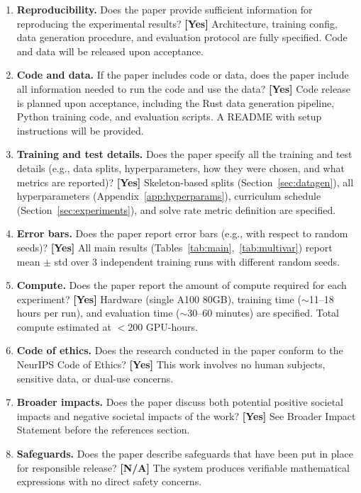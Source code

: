 \documentclass{article}
\begin{document}
\begin{enumerate}
\item \textbf{Reproducibility.}
Does the paper provide sufficient information for reproducing the experimental results?
\textbf{[Yes]} Architecture, training config, data generation procedure, and evaluation protocol are fully specified. Code and data will be released upon acceptance.

\item \textbf{Code and data.}
If the paper includes code or data, does the paper include all information needed to run the code and use the data?
\textbf{[Yes]} Code release is planned upon acceptance, including the Rust data generation pipeline, Python training code, and evaluation scripts. A README with setup instructions will be provided.

\item \textbf{Training and test details.}
Does the paper specify all the training and test details (e.g., data splits, hyperparameters, how they were chosen, and what metrics are reported)?
\textbf{[Yes]} Skeleton-based splits (Section~\ref{sec:datagen}), all hyperparameters (Appendix~\ref{app:hyperparams}), curriculum schedule (Section~\ref{sec:experiments}), and solve rate metric definition are specified.

\item \textbf{Error bars.}
Does the paper report error bars (e.g., with respect to random seeds)?
\textbf{[Yes]} All main results (Tables~\ref{tab:main},~\ref{tab:multivar}) report mean $\pm$ std over 3 independent training runs with different random seeds.

\item \textbf{Compute.}
Does the paper report the amount of compute required for each experiment?
\textbf{[Yes]} Hardware (single A100 80GB), training time ($\sim$11--18 hours per run), and evaluation time ($\sim$30--60 minutes) are specified. Total compute estimated at $<200$ GPU-hours.

\item \textbf{Code of ethics.}
Does the research conducted in the paper conform to the NeurIPS Code of Ethics?
\textbf{[Yes]} This work involves no human subjects, sensitive data, or dual-use concerns.

\item \textbf{Broader impacts.}
Does the paper discuss both potential positive societal impacts and negative societal impacts of the work?
\textbf{[Yes]} See Broader Impact Statement before the references section.

\item \textbf{Safeguards.}
Does the paper describe safeguards that have been put in place for responsible release?
\textbf{[N/A]} The system produces verifiable mathematical expressions with no direct safety concerns.


\end{enumerate}
\end{document}
